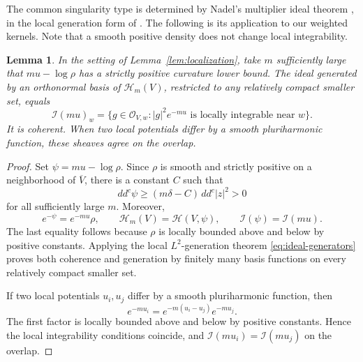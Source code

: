 \documentclass[reqno]{amsart}
\numberwithin{equation}{section}
\newtheorem{lemma}[theorem]{Lemma}
\theoremstyle{definition}
\begin{document}
The common singularity type is determined by Nadel's multiplier
ideal theorem \cite{Nadel}, in the local generation form of
\cite[Proposition~5.7]{D00}. The following is its application
to our weighted kernels. Note that a smooth positive density does not
change local integrability.
\begin{lemma}\label{lem:common-ideal}
In the setting of Lemma~\ref{lem:localization}, take $m$ sufficiently large that $mu-\log\rho$ has a strictly positive curvature lower bound. The ideal generated by an orthonormal basis of $\mathscr H_m(V)$, restricted to any relatively compact smaller set, equals
\begin{equation}\label{eq:common-ideal}
\mathcal I(mu)_w=\{g\in\mathcal O_{V,w}:|g|^2e^{-mu}
                         \text{ is locally integrable near }w\}.
\end{equation}
It is coherent. When two local potentials differ by a smooth pluriharmonic function, these sheaves agree on the overlap.
\end{lemma}
\begin{proof}
Set $\psi=mu-\log\rho$. Since $\rho$ is smooth and strictly
positive on a neighborhood of $\overline V$, there is a constant
$C$ such that
\[
dd^c\psi\ge(m\delta-C)\,dd^c|z|^2>0
\]
for all sufficiently large $m$. Moreover,
\[
e^{-\psi}=e^{-mu}\rho,\qquad
\mathscr H_m(V)=\mathscr H(V,\psi),\qquad
\mathcal I(\psi)=\mathcal I(mu).
\]
The last equality follows because $\rho$ is locally bounded
above and below by positive constants. Applying the local
$L^2$-generation theorem
\eqref{eq:ideal-generators}
proves both coherence and generation by finitely many basis
functions on every relatively compact smaller set.

If two local potentials $u_i,u_j$ differ by a smooth
pluriharmonic function, then
\[
e^{-mu_i}=e^{-m(u_i-u_j)}e^{-mu_j}.
\]
The first factor is locally bounded above and below by positive
constants. Hence the local integrability conditions coincide,
and $\mathcal I(mu_i)=\mathcal I(mu_j)$ on the overlap.
\end{proof}
\end{document}
